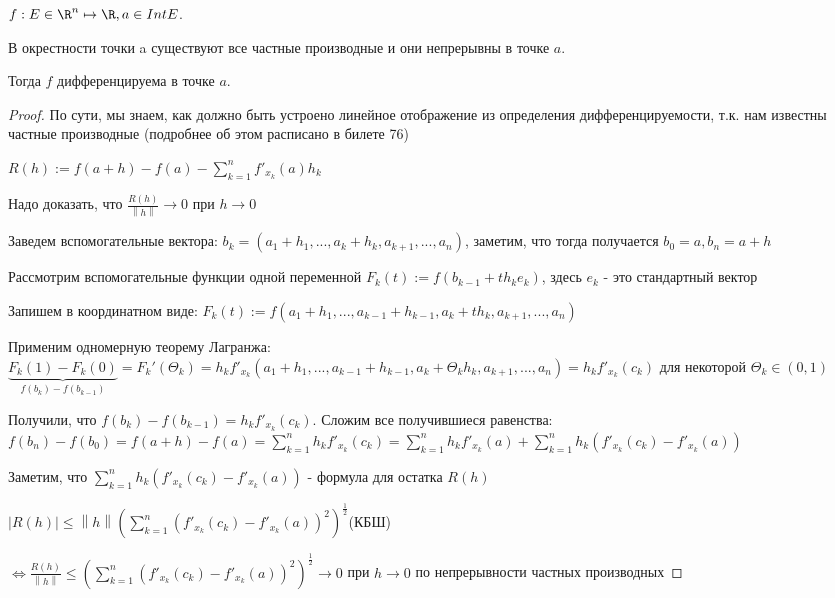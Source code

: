 
\begin{theorem} \thmslashn

    $f : E \in \R^n \mapsto \R, a \in Int E$.

    В окрестности точки a существуют все частные производные и они непрерывны в точке $a$.

    Тогда $f$ дифференцируема в точке $a$.


    \begin{proof} \thmslashn

	По сути, мы знаем, как должно быть устроено линейное отображение из определения дифференцируемости, т.к. нам известны частные производные (подробнее об этом расписано в билете 76)

	$R(h) := f(a + h) - f(a) - \sum_{k = 1}^n f'_{x_k}(a)h_k$

	Надо доказать, что $\frac{R(h)}{\left\| h \right\|} \to 0$ при $h \to 0$

	Заведем вспомогательные вектора: $b_k = (a_1 + h_1, ..., a_k + h_k, a_{k + 1}, ..., a_n)$, заметим, что тогда получается $b_0 = a, b_n = a + h$

	Рассмотрим вспомогательные функции одной переменной $F_k(t) := f(b_{k - 1} + th_ke_k)$, здесь $e_k$ - это стандартный вектор
 
	Запишем в координатном виде: $F_k(t) := f(a_1 + h_1, ..., a_{k - 1} + h_{k - 1}, a_k + th_k, a_{k + 1}, ..., a_n)$

	Применим одномерную теорему Лагранжа: $\underbrace{F_k(1) - F_k(0)}_{f(b_k) - f(b_{k - 1})} = F_k'(\Theta_k) = h_kf'_{x_k}(a_1 + h_1, ..., a_{k - 1} + h_{k - 1}, a_k + \Theta_kh_k, a_{k + 1},...,a_n) = h_kf'_{x_k}(c_k)$ для некоторой $\Theta_k \in (0, 1)$

	Получили, что $f(b_k) - f(b_{k - 1}) = h_kf'_{x_k}(c_k)$. Сложим все получившиеся равенства: $f(b_n) - f(b_0) = f(a + h) - f(a) = \sum_{k = 1}^n h_kf'_{x_k}(c_k) = \sum_{k = 1}^n h_kf'_{x_k}(a) + \sum_{k = 1}^n h_k(f'_{x_k}(c_k) - f'_{x_k}(a))$

	Заметим, что $\sum_{k = 1}^n h_k(f'_{x_k}(c_k) - f'_{x_k}(a))$ - формула для остатка $R(h)$

	$\left| R(h)\right| \le \left\| h \right\| (\sum_{k = 1}^n(f'_{x_k}(c_k) - f'_{x_k}(a))^2)^{\frac{1}{2}}$(КБШ)

	$\iff \frac{R(h)}{\left\| h \right\|} \le (\sum_{k = 1}^n(f'_{x_k}(c_k) - f'_{x_k}(a))^2)^{\frac{1}{2}} \to 0$ при $h \to 0$ по непрерывности частных производных


\end{proof}
\end{theorem}
